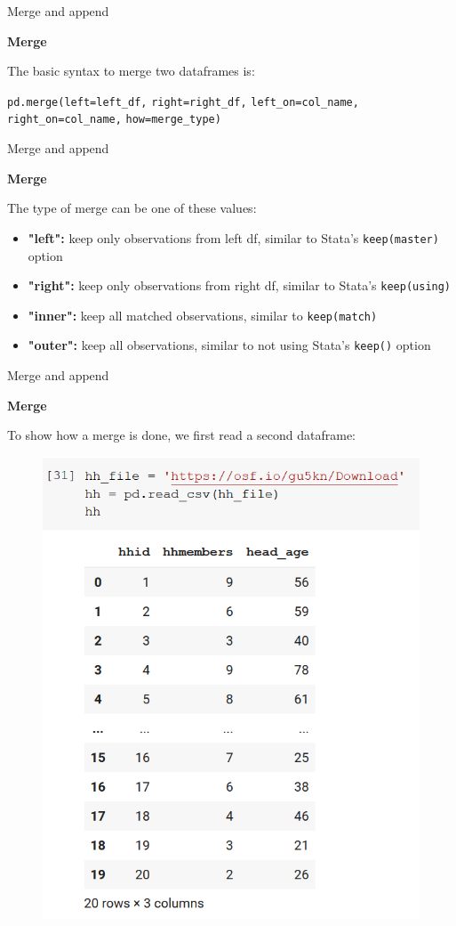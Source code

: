 \documentclass[aspectratio=169]{beamer}
\begin{document}
\begin{frame}{Merge and append}

	\textbf{Merge}

	The basic syntax to merge two dataframes is:

	\hspace{7mm} \texttt{pd.merge(left=left\_df,}
	\newline \hspace*{25.5mm} \texttt{right=right\_df,}
	\newline \hspace*{25.5mm} \texttt{left\_on=col\_name,}
	\newline \hspace*{25.5mm} \texttt{right\_on=col\_name,}
	\newline \hspace*{25.5mm} \texttt{how=merge\_type)}

\end{frame}

\begin{frame}{Merge and append}

	\textbf{Merge}

	The type of merge can be one of these values:

	\begin{itemize}
		\item \textbf{"left":} keep only observations from left df, similar to Stata's \texttt{keep(master)} option
		\item \textbf{"right":} keep only observations from right df, similar to Stata's \texttt{keep(using)}
		\item \textbf{"inner":} keep all matched observations, similar to \texttt{keep(match)}
		\item \textbf{"outer":} keep all observations, similar to not using Stata's \texttt{keep()} option
	\end{itemize}

\end{frame}

\begin{frame}{Merge and append}

	\textbf{Merge}

	To show how a merge is done, we first read a second dataframe:

	\begin{figure}
		\centering
		\includegraphics[width=0.33\linewidth]{img/hh_df.png}
	\end{figure}

\end{frame}
\end{document}
